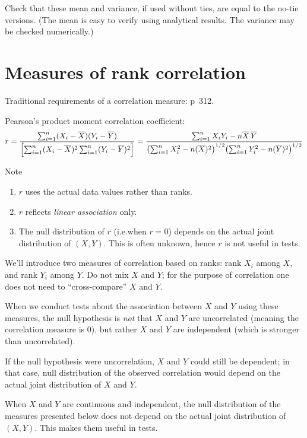 \documentclass[12pt]{article}
\begin{document}
\exercise
Check that these mean and variance,
if used without ties,
are equal to the no-tie versions.
(The mean is easy to verify using analytical results.
The variance may be checked numerically.)

\section{Measures of rank correlation}

Traditional requirements of a correlation measure:
p~312.

Pearson's product moment correlation coefficient:
\[
r
= \frac{\sum_{i=1}^n (X_i - \overline{X})(Y_i - \overline{Y})}
    {\Bigl[\sum_{i=1}^n (X_i - \overline{X})^2
            \sum_{i=1}^n (Y_i - \overline{Y})^2 \Bigr]}
= \frac{\sum_{i=1}^n X_iY_i - n\overline{X}\,\overline{Y}}
    {\bigl(\sum_{i=1}^n X_i^2 - n(\overline{X})^2\bigr)^{1/2}
        \bigl(\sum_{i=1}^n Y_i^2 - n(\overline{Y})^2\bigr)^{1/2}}
\]

Note
\begin{enumerate}
\item $r$ uses the actual data values rather than ranks.
\item $r$ reflects \emph{linear association} only.
\item The null distribution of $r$ (i.e.\@ when $r=0$)
    depends on the actual joint distribution of $(X,Y)$.
    This is often unknown, hence $r$ is not useful in tests.
\end{enumerate}

We'll introduce two measures of correlation based on ranks:
rank $X_i$ among $X$, and rank $Y_i$ among $Y$.
Do not mix $X$ and $Y$;
for the purpose of correlation one does not need to ``cross-compare''
$X$ and $Y$.

When we conduct tests about the association between $X$ and $Y$
using these measures, the null hypothesis is \emph{not} that
$X$ and $Y$ are uncorrelated (meaning the correlation measure is 0),
but rather $X$ and $Y$ are independent (which is stronger than
uncorrelated).

If the null hypothesis were uncorrelation,
$X$ and $Y$ could still be dependent;
in that case, null distribution of the observed correlation
would depend on the actual joint distribution of $X$ and $Y$.

When $X$ and $Y$ are continuous and independent,
the null distribution of the measures presented below
does not depend on the actual joint distribution of $(X,Y)$.
This makes them useful in tests.
\end{document}
